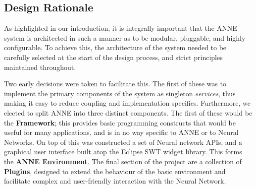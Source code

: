 \documentclass{acm_proc_article-sp}
\begin{document}
\subsection{Design Rationale}
{
As highlighted in our introduction, it is integrally important that the ANNE system is architected in such a manner as to be modular, pluggable, and highly configurable. To achieve this, the architecture of the system needed to be carefully selected at the start of the design process, and strict principles maintained throughout.

Two early decisions were taken to facilitate this. The first of these was to implement the primary components of the system as singleton {\textit{services}}, thus making it easy to reduce coupling and implementation specifics. Furthermore, we elected to split ANNE into three distinct components. The first of these would be the {\textbf{Framework}}; this provides basic programming constructs that would be useful for many applications, and is in no way specific to ANNE or to Neural Networks. On top of this was constructed a set of Neural network APIs, and a graphical user interface built atop the Eclipse SWT widget library. This forms the {\textbf{ANNE Environment}}. The final section of the project are a collection of {\textbf{Plugins}}, designed to extend the behaviour of the basic environment and facilitate complex and user{}-friendly interaction with the Neural Network.

}
\end{document}
